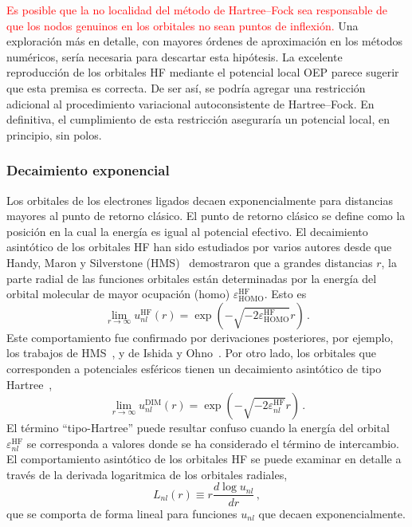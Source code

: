 \textcolor{red}{Es posible que la no localidad del método de Hartree--Fock sea responsable de que los nodos genuinos en los orbitales no sean puntos de inflexión.} Una exploración más en detalle, con mayores órdenes de aproximación en los métodos numéricos, sería necesaria para descartar esta hipótesis. La excelente reproducción de los orbitales HF mediante el potencial local OEP parece sugerir que esta premisa es correcta. De ser así, se podría agregar una restricción adicional al procedimiento variacional autoconsistente de Hartree--Fock. En definitiva, el cumplimiento de esta restricción aseguraría un potencial local, en principio, sin polos.

\subsubsection{Decaimiento exponencial}

Los orbitales de los electrones ligados decaen exponencialmente para 
distancias mayores al punto de retorno clásico. El punto de retorno 
clásico se define como la posición en la cual la energía es igual al 
potencial efectivo. El decaimiento asintótico de los orbitales HF han 
sido estudiados por varios autores desde que Handy, Maron y Silverstone 
(HMS)~\cite{Handy:69} demostraron que a grandes distancias $r$, la parte 
radial de las funciones orbitales están determinadas por la energía del 
orbital molecular de mayor ocupación (\acs{homo}) 
$\varepsilon_{\mathrm{HOMO}}^{\mathrm{HF}}$. Esto es 
\begin{equation}
\lim_{r \rightarrow \infty} u_{nl}^{\mathrm{HF}}(r) =  
\exp(- \sqrt{- 2 \varepsilon_{\mathrm{HOMO}}^{\mathrm{HF}} } r )  \, .
\label{eq:rHF}
\end{equation}
Este comportamiento fue confirmado por derivaciones posteriores, por 
ejemplo, los trabajos de HMS~\cite{Handler:80}, y de Ishida y 
Ohno~\cite{Ishida:92}. Por otro lado, los orbitales que corresponden a 
potenciales esféricos tienen un decaimiento asintótico de tipo 
Hartree~\cite{Casida:89},
\begin{equation}
\lim_{r \rightarrow \infty} u_{nl}^{\mathrm{DIM}}(r) =  
\exp(- \sqrt{- 2 \varepsilon_{nl}^{\mathrm{HF}} } r ) \,.
\label{eq:rHlike}
\end{equation}
El término ``tipo-Hartree'' puede resultar confuso cuando la energía 
del orbital $\varepsilon_{nl}^{\mathrm{HF}}$ se corresponda a valores 
donde se ha considerado el término de intercambio. El comportamiento 
asintótico de los orbitales HF se puede examinar en detalle a través de 
la derivada logaritmica de los orbitales radiales, 
\begin{equation}
L_{nl}(r) \equiv r \frac{d \log{u_{nl}}}{d r}\,,
\label{eq:Lnl}
\end{equation}
que se comporta de forma lineal para funciones $u_{nl}$ que decaen 
exponencialmente. 

